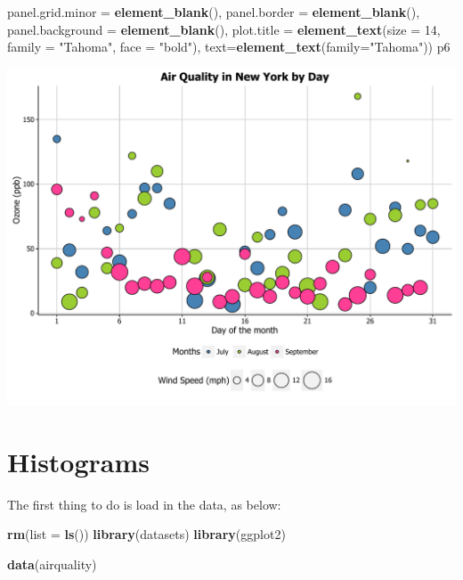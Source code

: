 \documentclass[]{article}
\newenvironment{Shaded}{\begin{snugshade}}{\end{snugshade}}
\newcommand{\KeywordTok}[1]{\textcolor[rgb]{0.13,0.29,0.53}{\textbf{{#1}}}}
\newcommand{\DataTypeTok}[1]{\textcolor[rgb]{0.13,0.29,0.53}{{#1}}}
\newcommand{\DecValTok}[1]{\textcolor[rgb]{0.00,0.00,0.81}{{#1}}}
\newcommand{\StringTok}[1]{\textcolor[rgb]{0.31,0.60,0.02}{{#1}}}
\newcommand{\NormalTok}[1]{{#1}}
\begin{document}
\begin{Shaded}
\begin{Highlighting}[]
            \DataTypeTok{panel.grid.minor =} \KeywordTok{element_blank}\NormalTok{(), }
            \DataTypeTok{panel.border =} \KeywordTok{element_blank}\NormalTok{(), }\DataTypeTok{panel.background =} \KeywordTok{element_blank}\NormalTok{(),}
            \DataTypeTok{plot.title =} \KeywordTok{element_text}\NormalTok{(}\DataTypeTok{size =} \DecValTok{14}\NormalTok{, }\DataTypeTok{family =} \StringTok{"Tahoma"}\NormalTok{, }\DataTypeTok{face =} \StringTok{"bold"}\NormalTok{),}
            \DataTypeTok{text=}\KeywordTok{element_text}\NormalTok{(}\DataTypeTok{family=}\StringTok{"Tahoma"}\NormalTok{)) }
\NormalTok{p6}
\end{Highlighting}
\end{Shaded}

\begin{center}\includegraphics{0_all_posts_pdf/wscatter_20-1} \end{center}

\section{Histograms}\label{histograms}

The first thing to do is load in the data, as below:

\begin{Shaded}
\begin{Highlighting}[]
\KeywordTok{rm}\NormalTok{(}\DataTypeTok{list =} \KeywordTok{ls}\NormalTok{())}
\KeywordTok{library}\NormalTok{(datasets)}
\KeywordTok{library}\NormalTok{(ggplot2)}

\KeywordTok{data}\NormalTok{(airquality)}
\end{Highlighting}
\end{Shaded}
\end{document}
